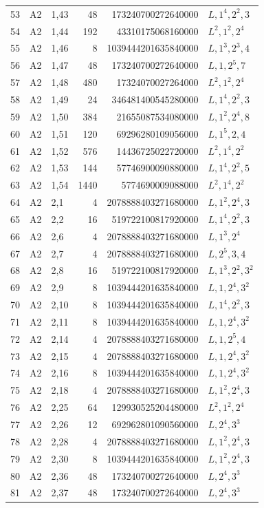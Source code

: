 \begin{longtable}{rllrrl}
53&A2&1,43&48&173240700272640000&$L,1^{4},2^{2},3$\\
54&A2&1,44&192&43310175068160000&$L^{2},1^{2},2^{4}$\\
55&A2&1,46&8&1039444201635840000&$L,1^{3},2^{3},4$\\
56&A2&1,47&48&173240700272640000&$L,1,2^{5},7$\\
57&A2&1,48&480&17324070027264000&$L^{2},1^{2},2^{4}$\\
58&A2&1,49&24&346481400545280000&$L,1^{4},2^{2},3$\\
59&A2&1,50&384&21655087534080000&$L,1^{2},2^{4},8$\\
60&A2&1,51&120&69296280109056000&$L,1^{5},2,4$\\
61&A2&1,52&576&14436725022720000&$L^{2},1^{4},2^{2}$\\
62&A2&1,53&144&57746900090880000&$L,1^{4},2^{2},5$\\
63&A2&1,54&1440&5774690009088000&$L^{2},1^{4},2^{2}$\\
64&A2&2,1&4&2078888403271680000&$L,1^{2},2^{4},3$\\
65&A2&2,2&16&519722100817920000&$L,1^{4},2^{2},3$\\
66&A2&2,6&4&2078888403271680000&$L,1^{3},2^{4}$\\
67&A2&2,7&4&2078888403271680000&$L,2^{5},3,4$\\
68&A2&2,8&16&519722100817920000&$L,1^{3},2^{2},3^{2}$\\
69&A2&2,9&8&1039444201635840000&$L,1,2^{4},3^{2}$\\
70&A2&2,10&8&1039444201635840000&$L,1^{4},2^{2},3$\\
71&A2&2,11&8&1039444201635840000&$L,1,2^{4},3^{2}$\\
72&A2&2,14&4&2078888403271680000&$L,1,2^{5},4$\\
73&A2&2,15&4&2078888403271680000&$L,1,2^{4},3^{2}$\\
74&A2&2,16&8&1039444201635840000&$L,1,2^{4},3^{2}$\\
75&A2&2,18&4&2078888403271680000&$L,1^{2},2^{4},3$\\
76&A2&2,25&64&129930525204480000&$L^{2},1^{2},2^{4}$\\
77&A2&2,26&12&692962801090560000&$L,2^{4},3^{3}$\\
78&A2&2,28&4&2078888403271680000&$L,1^{2},2^{4},3$\\
79&A2&2,30&8&1039444201635840000&$L,1^{2},2^{4},3$\\
80&A2&2,36&48&173240700272640000&$L,2^{4},3^{3}$\\
81&A2&2,37&48&173240700272640000&$L,2^{4},3^{3}$\\

\end{longtable}
